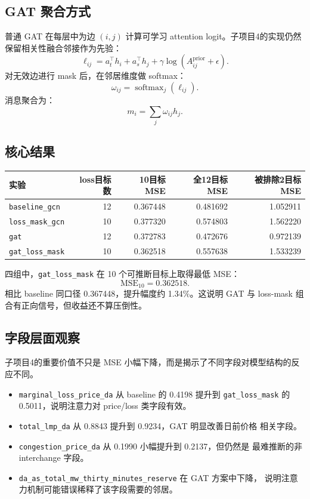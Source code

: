 \documentclass[UTF8,a4paper,11pt]{ctexart}
\begin{document}
\subsection{GAT 聚合方式}

普通 GAT 在每层中为边 $(i,j)$ 计算可学习 attention logit。子项目4的实现仍然
保留相关性融合邻接作为先验：
\[
  \ell_{ij}
  =
  a_t^\top h_i
  +
  a_s^\top h_j
  +
  \gamma \log(A_{ij}^{\text{prior}} + \epsilon).
\]
对无效边进行 mask 后，在邻居维度做 softmax：
\[
  \omega_{ij}
  =
  \operatorname{softmax}_j(\ell_{ij}).
\]
消息聚合为：
\[
  m_i = \sum_j \omega_{ij} h_j.
\]

\subsection{核心结果}

\begin{center}
\begin{tabular}{lrrrr}
\toprule
实验 & loss目标数 & 10目标MSE & 全12目标MSE & 被排除2目标MSE \\
\midrule
\texttt{baseline\_gcn} & 12 & 0.367448 & 0.481692 & 1.052911 \\
\texttt{loss\_mask\_gcn} & 10 & 0.377320 & 0.574803 & 1.562220 \\
\texttt{gat} & 12 & 0.372783 & 0.472676 & 0.972139 \\
\texttt{gat\_loss\_mask} & 10 & 0.362518 & 0.557638 & 1.533239 \\
\bottomrule
\end{tabular}
\end{center}

四组中，\texttt{gat\_loss\_mask} 在 10 个可推断目标上取得最低 MSE：
\[
  \text{MSE}_{10} = 0.362518.
\]
相比 baseline 同口径 0.367448，提升幅度约 1.34\%。这说明 GAT 与 loss-mask
组合有正向信号，但收益还不算压倒性。

\subsection{字段层面观察}

子项目4的重要价值不只是 MSE 小幅下降，而是揭示了不同字段对模型结构的反应不同。
\begin{itemize}
  \item \texttt{marginal\_loss\_price\_da} 从 baseline 的 0.4198 提升到
  \texttt{gat\_loss\_mask} 的 0.5011，说明注意力对 price/loss 类字段有效。
  \item \texttt{total\_lmp\_da} 从 0.8843 提升到 0.9234，GAT 明显改善日前价格
  相关字段。
  \item \texttt{congestion\_price\_da} 从 0.1990 小幅提升到 0.2137，但仍然是
  最难推断的非 interchange 字段。
  \item \texttt{da\_as\_total\_mw\_thirty\_minutes\_reserve} 在 GAT 方案中下降，
  说明注意力机制可能错误稀释了该字段需要的邻居。
\end{itemize}
\end{document}
